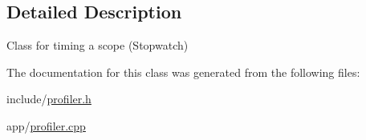 \subsection{Detailed Description}
Class for timing a scope (Stopwatch) 

The documentation for this class was generated from the following files\+:\begin{DoxyCompactItemize}
\item 
include/\hyperlink{profiler_8h}{profiler.\+h}\item 
app/\hyperlink{profiler_8cpp}{profiler.\+cpp}\end{DoxyCompactItemize}
